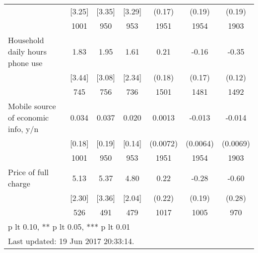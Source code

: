 \begin{table}[htbp]
\begin{tabular*}{1\hsize}{@{\hskip\tabcolsep\extracolsep\fill}l*{1}{cccccc}}
                                &   [3.25]&   [3.35]&   [3.29]&   (0.17)         &   (0.19)         &   (0.19)         \\
                                &     1001&      950&      953&     1951         &     1954         &     1903         \\
Household daily hours phone use &     1.83&     1.95&     1.61&     0.21         &    -0.16         &    -0.35\sym{***}\\
                                &   [3.44]&   [3.08]&   [2.34]&   (0.18)         &   (0.17)         &   (0.12)         \\
                                &      745&      756&      736&     1501         &     1481         &     1492         \\
Mobile source of economic info, y/n&    0.034&    0.037&    0.020&   0.0013         &   -0.013\sym{*}  &   -0.014\sym{*}  \\
                                &   [0.18]&   [0.19]&   [0.14]& (0.0072)         & (0.0064)         & (0.0069)         \\
                                &     1001&      950&      953&     1951         &     1954         &     1903         \\
Price of full charge            &     5.13&     5.37&     4.80&     0.22         &    -0.28         &    -0.60\sym{**} \\
                                &   [2.30]&   [3.36]&   [2.04]&   (0.22)         &   (0.19)         &   (0.28)         \\
                                &      526&      491&      479&     1017         &     1005         &      970         \\
\bottomrule
\multicolumn{7}{l}{\footnotesize * p lt 0.10, ** p lt 0.05, *** p lt 0.01}\\
\multicolumn{7}{l}{\footnotesize Last updated: 19 Jun 2017 20:33:14.}\\
\end{tabular*}
\end{table}
